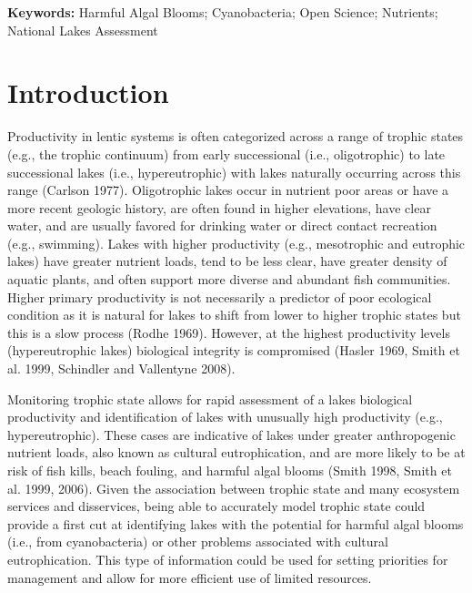 \documentclass[12pt,]{article}
\begin{document}
\doublespace

\textbf{Keywords:} Harmful Algal Blooms; Cyanobacteria; Open Science;
Nutrients; National Lakes Assessment

\section{Introduction}\label{introduction}

Productivity in lentic systems is often categorized across a range of
trophic states (e.g., the trophic continuum) from early successional
(i.e., oligotrophic) to late successional lakes (i.e., hypereutrophic)
with lakes naturally occurring across this range (Carlson 1977).
Oligotrophic lakes occur in nutrient poor areas or have a more recent
geologic history, are often found in higher elevations, have clear
water, and are usually favored for drinking water or direct contact
recreation (e.g., swimming). Lakes with higher productivity (e.g.,
mesotrophic and eutrophic lakes) have greater nutrient loads, tend to be
less clear, have greater density of aquatic plants, and often support
more diverse and abundant fish communities. Higher primary productivity
is not necessarily a predictor of poor ecological condition as it is
natural for lakes to shift from lower to higher trophic states but this
is a slow process (Rodhe 1969). However, at the highest productivity
levels (hypereutrophic lakes) biological integrity is compromised
(Hasler 1969, Smith et al. 1999, Schindler and Vallentyne 2008).

Monitoring trophic state allows for rapid assessment of a lakes
biological productivity and identification of lakes with unusually high
productivity (e.g., hypereutrophic). These cases are indicative of lakes
under greater anthropogenic nutrient loads, also known as cultural
eutrophication, and are more likely to be at risk of fish kills, beach
fouling, and harmful algal blooms (Smith 1998, Smith et al. 1999, 2006).
Given the association between trophic state and many ecosystem services
and disservices, being able to accurately model trophic state could
provide a first cut at identifying lakes with the potential for harmful
algal blooms (i.e., from cyanobacteria) or other problems associated
with cultural eutrophication. This type of information could be used for
setting priorities for management and allow for more efficient use of
limited resources.
\end{document}
